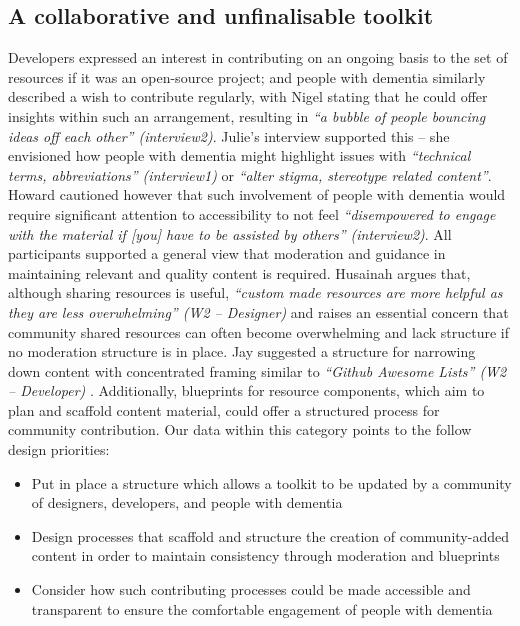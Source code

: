 \subsection{A collaborative and unfinalisable toolkit}
Developers expressed an interest in contributing on an ongoing basis to the set of resources if it was an open-source project; and people with dementia similarly described a wish to contribute regularly, with Nigel stating that he could offer insights within such an arrangement, resulting in \textit{``a bubble of people bouncing ideas off each other'' (interview2)}. Julie’s interview supported this – she envisioned how people with dementia might highlight issues with \textit{``technical terms, abbreviations'' (interview1)} or \textit{``alter stigma, stereotype related content''}. Howard cautioned however that such involvement of people with dementia would require significant attention to accessibility to not feel \textit{``disempowered to engage with the material if [you] have to be assisted by others'' (interview2)}. 
All participants supported a general view that moderation and guidance in maintaining relevant and quality content is required. Husainah argues that, although sharing resources is useful, \textit{``custom made resources are more helpful as they are less overwhelming'' (W2 – Designer)} and raises an essential concern that community shared resources can often become overwhelming and lack structure if no moderation structure is in place. Jay suggested a structure for narrowing down content with concentrated framing similar to \textit{``Github Awesome Lists'' (W2 – Developer) } \citep{sorhus_sindresorhusawesome_2021}. Additionally, blueprints for resource components, which aim to plan and scaffold content material, could offer a structured process for community contribution.
Our data within this category points to the follow design priorities:

\begin{itemize}
\item Put in place a structure which allows a toolkit to be updated by a community of designers, developers, and people with dementia
\item Design processes that scaffold and structure the creation of community-added content in order to maintain consistency through moderation and blueprints
\item Consider how such contributing processes could be made accessible and transparent to ensure the comfortable engagement of people with dementia
\end{itemize}

